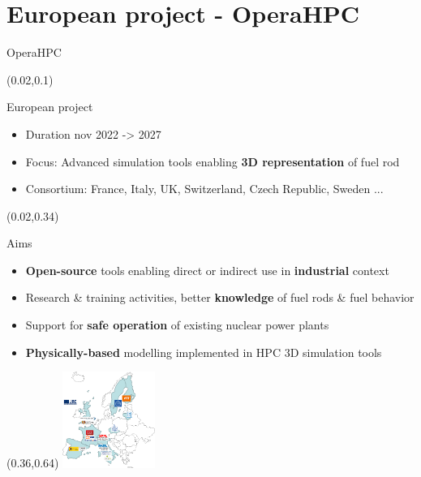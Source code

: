 \documentclass{beamer}
\begin{document}
\section{European project - OperaHPC}

\begin{frame}{{\small OperaHPC}\\\hspace*{1cm}{\footnotesize OPEn HPC theRmo-mechanical tools for the development of eAtf fuels}}
\begin{textblock}{.94}(0.02,0.1)
  \begin{block}{European project}
    \small
    \begin{itemize}
      \itemsep 0pt
      \parskip 0pt
      \item Duration nov 2022 -> 2027
      \item Focus: Advanced simulation tools enabling \textbf{3D representation} of fuel rod
      \item Consortium: France, Italy, UK, Switzerland, Czech Republic, Sweden ...
    \end{itemize}
  \end{block}
\end{textblock}
\begin{textblock}{.94}(0.02,0.34)
  \begin{block}{Aims}
    \small
    \begin{itemize}
      \itemsep 0pt
      \parskip 0pt
    \item \textbf{Open-source} tools enabling direct or indirect use in \textbf{industrial} context
    \item Research \& training activities, better \textbf{knowledge} of fuel rods \& fuel behavior
    \item Support for \textbf{safe operation} of existing nuclear power plants
    \item \textbf{Physically-based} modelling implemented in HPC 3D simulation tools
    \end{itemize}
  \end{block}
\end{textblock}
\begin{textblock}{.7}(0.36,0.64)
\includegraphics[trim = .1cm .25cm .02cm 1.1cm,clip,width=3cm]{img/members_operahpc.png}
\end{textblock}
\end{frame}
\end{document}
